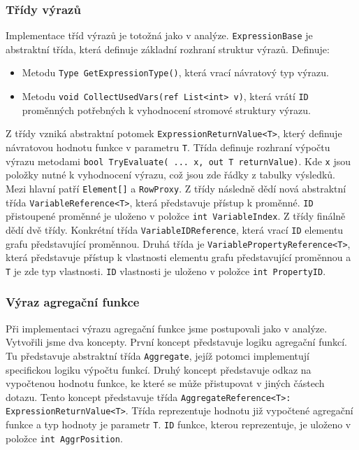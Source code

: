 \subsubsection{Třídy výrazů}

Implementace tříd výrazů je totožná jako v analýze.
\texttt{ExpressionBase} je abstraktní třída, která definuje základní rozhraní struktur výrazů.
Definuje:
\begin{itemize}
\item Metodu \texttt{Type GetExpressionType()}, která vrací návratový typ výrazu.
\item Metodu \texttt{void CollectUsedVars(ref List<int> v)}, která vrátí \texttt{ID} proměnných potřebných k vyhodnocení stromové struktury výrazu.
\end{itemize}
Z třídy vzniká abstraktní potomek \texttt{ExpressionReturnValue<T>}, který definuje návratovou hodnotu funkce v parametru \texttt{T}.
Třída definuje rozhraní výpočtu výrazu metodami \texttt{bool TryEvaluate( ... x, out T returnValue)}.
Kde \texttt{x} jsou položky nutné k vyhodnocení výrazu, což jsou zde řádky z tabulky výsledků.
Mezi hlavní patří \texttt{Element[]} a \texttt{RowProxy}.
Z třídy následně dědí nová abstraktní třída \texttt{VariableReference<T>}, která představuje přístup k proměnné.
\texttt{ID} přistoupené proměnné je uloženo v položce \texttt{int VariableIndex}.
Z třídy finálně dědí dvě třídy.
Konkrétní třída \texttt{VariableIDReference}, která vrací \texttt{ID} elementu grafu představující proměnnou.
Druhá třída je \texttt{VariablePropertyReference<T>}, která představuje přístup k vlastnosti elementu grafu představující proměnnou a \texttt{T} je zde typ vlastnosti.
\texttt{ID} vlastnosti je uloženo v položce \texttt{int PropertyID}. 

\subsubsection{Výraz agregační funkce}

Při implementaci výrazu agregační funkce jsme postupovali jako v analýze.
Vytvořili jsme dva koncepty.
První koncept představuje logiku agregační funkcí.
Tu představuje abstraktní třída \texttt{Aggregate}, jejíž potomci implementují specifickou logiku výpočtu funkcí. 
Druhý koncept představuje odkaz na vypočtenou hodnotu funkce, ke které se může přistupovat v jiných částech dotazu.
Tento koncept představuje třída \texttt{AggregateReference<T>: ExpressionReturnValue<T>}.
Třída reprezentuje hodnotu již vypočtené agregační funkce a typ hodnoty je parametr \texttt{T}.
\texttt{ID} funkce, kterou reprezentuje, je uloženo v položce \texttt{int AggrPosition}.

